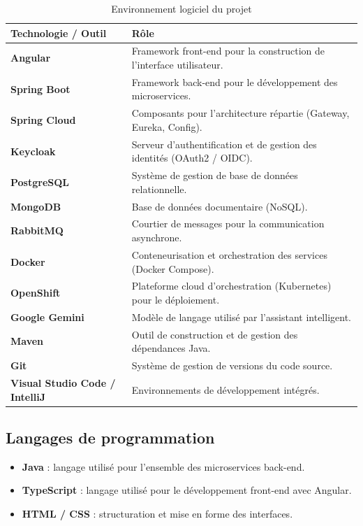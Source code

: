 \begin{table}[H]\centering\renewcommand{\arraystretch}{1.3}
\begin{tabular}{|p{3.6cm}|p{10.2cm}|}\hline
\rowcolor{gray!15}\textbf{Technologie / Outil} & \textbf{Rôle} \\ \hline
\textbf{Angular} & Framework front-end pour la construction de l'interface utilisateur. \\ \hline
\textbf{Spring Boot} & Framework back-end pour le développement des microservices. \\ \hline
\textbf{Spring Cloud} & Composants pour l'architecture répartie (Gateway, Eureka, Config). \\ \hline
\textbf{Keycloak} & Serveur d'authentification et de gestion des identités (OAuth2 / OIDC). \\ \hline
\textbf{PostgreSQL} & Système de gestion de base de données relationnelle. \\ \hline
\textbf{MongoDB} & Base de données documentaire (NoSQL). \\ \hline
\textbf{RabbitMQ} & Courtier de messages pour la communication asynchrone. \\ \hline
\textbf{Docker} & Conteneurisation et orchestration des services (Docker Compose). \\ \hline
\textbf{OpenShift} & Plateforme cloud d'orchestration (Kubernetes) pour le déploiement. \\ \hline
\textbf{Google Gemini} & Modèle de langage utilisé par l'assistant intelligent. \\ \hline
\textbf{Maven} & Outil de construction et de gestion des dépendances Java. \\ \hline
\textbf{Git} & Système de gestion de versions du code source. \\ \hline
\textbf{Visual Studio Code / IntelliJ} & Environnements de développement intégrés. \\ \hline
\end{tabular}
\caption{Environnement logiciel du projet}\label{tab:env}
\end{table}

\subsection{Langages de programmation}
\begin{itemize}[leftmargin=1.2cm]
  \item \textbf{Java} : langage utilisé pour l'ensemble des microservices back-end.
  \item \textbf{TypeScript} : langage utilisé pour le développement front-end avec Angular.
  \item \textbf{HTML / CSS} : structuration et mise en forme des interfaces.
\end{itemize}

